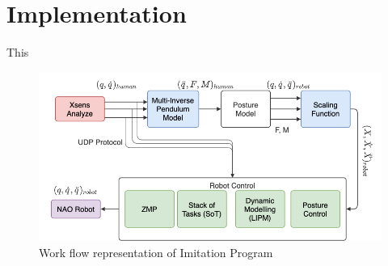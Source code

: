 \chapter{Implementation}
\label{chapter-6}

This
\begin{figure}[h!]
    \centering
    \includegraphics[scale=0.55]{images/flowchart-block-diagram.png}\hfill
    \caption{Work flow representation of Imitation Program}\hfill
    \label{fig: block-diagram}
\end{figure}